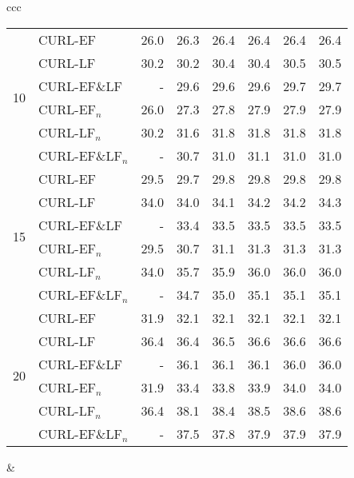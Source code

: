 \documentclass[journal,11pt]{IEEEtran}
\begin{document}
\begin{center}
{\begin{tabular}{ccc}
\begin{tabular}{|r|l|rrrrrr|}
\hline
\multirow{6}{*}{10}
& CURL-EF & 26.0 & 26.3 & 26.4 & 26.4 & 26.4 & 26.4 \\
& CURL-LF & 30.2 & 30.2 & 30.4 & 30.4 & 30.5 & 30.5 \\
& CURL-EF\&LF & - & 29.6 & 29.6 & 29.6 & 29.7 & 29.7 \\
& CURL-EF$_n$ & 26.0 & 27.3 & 27.8 & 27.9 & 27.9 & 27.9 \\
& CURL-LF$_n$ & 30.2 & 31.6 & 31.8 & 31.8 & 31.8 & 31.8 \\
& CURL-EF\&LF$_n$ & - & 30.7 & 31.0 & 31.1 & 31.0 & 31.0 \\
\hline
\multirow{6}{*}{15}
& CURL-EF & 29.5 & 29.7 & 29.8 & 29.8 & 29.8 & 29.8 \\
& CURL-LF & 34.0 & 34.0 & 34.1 & 34.2 & 34.2 & 34.3 \\
& CURL-EF\&LF & - & 33.4 & 33.5 & 33.5 & 33.5 & 33.5 \\
& CURL-EF$_n$ & 29.5 & 30.7 & 31.1 & 31.3 & 31.3 & 31.3 \\
& CURL-LF$_n$ & 34.0 & 35.7 & 35.9 & 36.0 & 36.0 & 36.0 \\
& CURL-EF\&LF$_n$ & - & 34.7 & 35.0 & 35.1 & 35.1 & 35.1 \\
\hline
\multirow{6}{*}{20}
& CURL-EF & 31.9 & 32.1 & 32.1 & 32.1 & 32.1 & 32.1 \\
& CURL-LF & 36.4 & 36.4 & 36.5 & 36.6 & 36.6 & 36.6 \\
& CURL-EF\&LF & - & 36.1 & 36.1 & 36.1 & 36.0 & 36.0 \\
& CURL-EF$_n$ & 31.9 & 33.4 & 33.8 & 33.9 & 34.0 & 34.0 \\
& CURL-LF$_n$ & 36.4 & 38.1 & 38.4 & 38.5 & 38.6 & 38.6 \\
& CURL-EF\&LF$_n$ & - & 37.5 & 37.8 & 37.9 & 37.9 & 37.9 \\
\hline
\end{tabular}

&


\end{tabular}}
\end{center}
\end{document}
